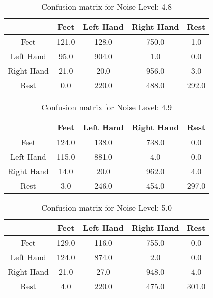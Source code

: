 \begin{table}[!htbp]
    \centering
    \begin{tabular}{|c||c|c|c|c|}
        \hline
		 & Feet & Left Hand & Right Hand & Rest \\
        \hline
        \hline
        Feet & 121.0 & 128.0 & 750.0 & 1.0 \\
        \hline
        Left Hand & 95.0 & 904.0 & 1.0 & 0.0 \\
        \hline
        Right Hand & 21.0 & 20.0 & 956.0 & 3.0 \\
        \hline
        Rest & 0.0 & 220.0 & 488.0 & 292.0 \\
        \hline
    \end{tabular}
    \caption{Confusion matrix for Noise Level: 4.8}
\end{table}

\begin{table}[!htbp]
    \centering
    \begin{tabular}{|c||c|c|c|c|}
        \hline
		 & Feet & Left Hand & Right Hand & Rest \\
        \hline
        \hline
        Feet & 124.0 & 138.0 & 738.0 & 0.0 \\
        \hline
        Left Hand & 115.0 & 881.0 & 4.0 & 0.0 \\
        \hline
        Right Hand & 14.0 & 20.0 & 962.0 & 4.0 \\
        \hline
        Rest & 3.0 & 246.0 & 454.0 & 297.0 \\
        \hline
    \end{tabular}
    \caption{Confusion matrix for Noise Level: 4.9}
\end{table}

\begin{table}[!htbp]
    \centering
    \begin{tabular}{|c||c|c|c|c|}
        \hline
		 & Feet & Left Hand & Right Hand & Rest \\
        \hline
        \hline
        Feet & 129.0 & 116.0 & 755.0 & 0.0 \\
        \hline
        Left Hand & 124.0 & 874.0 & 2.0 & 0.0 \\
        \hline
        Right Hand & 21.0 & 27.0 & 948.0 & 4.0 \\
        \hline
        Rest & 4.0 & 220.0 & 475.0 & 301.0 \\
        \hline
    \end{tabular}
    \caption{Confusion matrix for Noise Level: 5.0}
\end{table}

